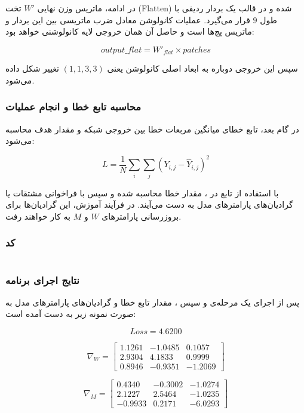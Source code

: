 \documentclass{article}
\begin{document}
در ادامه، ماتریس وزن نهایی $W'$ تخت (Flatten) شده و در قالب یک بردار ردیفی با طول $9$ قرار می‌گیرد. عملیات کانولوشن معادل ضرب ماتریسی بین این بردار و ماتریس پچ‌ها است و حاصل آن همان خروجی لایه کانولوشنی خواهد بود:

\[
output\_flat = W'_{flat} \times patches
\]

سپس این خروجی دوباره به ابعاد اصلی کانولوشن یعنی $(1,1,3,3)$ تغییر شکل داده می‌شود.

\subsubsection{محاسبه تابع خطا و انجام عملیات }

در گام بعد، تابع خطای میانگین مربعات خطا  بین خروجی شبکه و مقدار هدف محاسبه می‌شود:

\[
L = \frac{1}{N} \sum_i \sum_j (Y_{i,j} - \hat{Y}_{i,j})^2
\]

با استفاده از تابع  در ، مقدار خطا محاسبه شده و سپس با فراخوانی  مشتقات یا گرادیان‌های پارامترهای مدل به دست می‌آیند.  
در فرآیند آموزش، این گرادیان‌ها برای بروزرسانی پارامترهای $W$ و $M$ به کار خواهند رفت.

\subsubsection{کد}
\begin{LTR}
	\inputminted{python}{code/ml_hw2_q1.py}
\end{LTR}

\subsubsection{نتایج اجرای برنامه}

پس از اجرای یک مرحله‌ی  و سپس ، مقدار تابع خطا و گرادیان‌های پارامترهای مدل به صورت نمونه زیر به دست آمده است:

\[
Loss = 4.6200
\]

\[
\nabla_W =
\begin{bmatrix}
	1.1261 & -1.0485 & 0.1057 \\
	2.9304 & 4.1833 & 0.9999 \\
	0.8946 & -0.9351 & -1.2069
\end{bmatrix}
\]

\[
\nabla_M =
\begin{bmatrix}
	0.4340 & -0.3002 & -1.0274 \\
	2.1227 & 2.5464 & -1.0235 \\
	-0.9933 & 0.2171 & -6.0293
\end{bmatrix}
\]
\end{document}

